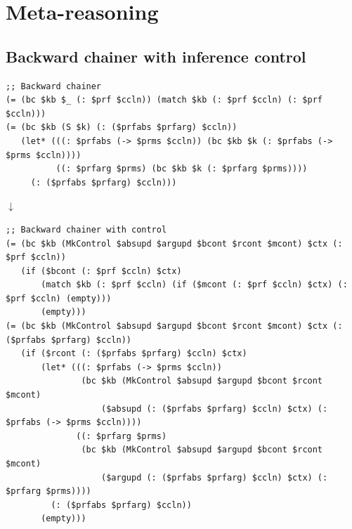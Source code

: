 \documentclass[aspectratio=169]{beamer}
\begin{document}
\section{Meta-reasoning}

\subsection{Backward chainer with inference control}

\begin{frame}[fragile]
  \begin{lstlisting}
;; Backward chainer
(= (bc $kb $_ (: $prf $ccln)) (match $kb (: $prf $ccln) (: $prf $ccln)))
(= (bc $kb (S $k) (: ($prfabs $prfarg) $ccln))
   (let* (((: $prfabs (-> $prms $ccln)) (bc $kb $k (: $prfabs (-> $prms $ccln))))
          ((: $prfarg $prms) (bc $kb $k (: $prfarg $prms))))
     (: ($prfabs $prfarg) $ccln)))
  \end{lstlisting}

  \begin{center} $\downarrow$ \end{center}

  \begin{lstlisting}
;; Backward chainer with control
(= (bc $kb (MkControl $absupd $argupd $bcont $rcont $mcont) $ctx (: $prf $ccln))
   (if ($bcont (: $prf $ccln) $ctx)
       (match $kb (: $prf $ccln) (if ($mcont (: $prf $ccln) $ctx) (: $prf $ccln) (empty)))
       (empty)))
(= (bc $kb (MkControl $absupd $argupd $bcont $rcont $mcont) $ctx (: ($prfabs $prfarg) $ccln))
   (if ($rcont (: ($prfabs $prfarg) $ccln) $ctx)
       (let* (((: $prfabs (-> $prms $ccln))
               (bc $kb (MkControl $absupd $argupd $bcont $rcont $mcont)
                   ($absupd (: ($prfabs $prfarg) $ccln) $ctx) (: $prfabs (-> $prms $ccln))))
              ((: $prfarg $prms)
               (bc $kb (MkControl $absupd $argupd $bcont $rcont $mcont)
                   ($argupd (: ($prfabs $prfarg) $ccln) $ctx) (: $prfarg $prms))))
         (: ($prfabs $prfarg) $ccln))
       (empty)))
  \end{lstlisting}

\end{frame}
\end{document}
